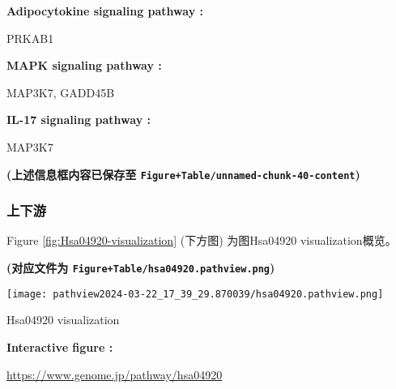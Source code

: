 \documentclass[
]{article}
\begin{document}
\begin{center}\begin{tcolorbox}[colback=gray!10, colframe=gray!50, width=0.9\linewidth, arc=1mm, boxrule=0.5pt]
\textbf{
Adipocytokine signaling pathway
:}

\vspace{0.5em}

    PRKAB1

\vspace{2em}


\textbf{
MAPK signaling pathway
:}

\vspace{0.5em}

    MAP3K7, GADD45B

\vspace{2em}


\textbf{
IL-17 signaling pathway
:}

\vspace{0.5em}

    MAP3K7

\vspace{2em}
\end{tcolorbox}
\end{center}

\textbf{(上述信息框内容已保存至 \texttt{Figure+Table/unnamed-chunk-40-content})}

\hypertarget{epi-path}{%
\subsubsection{上下游}\label{epi-path}}

Figure \ref{fig:Hsa04920-visualization} (下方图) 为图Hsa04920 visualization概览。

\textbf{(对应文件为 \texttt{Figure+Table/hsa04920.pathview.png})}

\def\@captype{figure}
\begin{center}
\texttt{[image: pathview2024-03-22\_17\_39\_29.870039/hsa04920.pathview.png]}
\caption{Hsa04920 visualization}\label{fig:Hsa04920-visualization}
\end{center}
\begin{center}\begin{tcolorbox}[colback=gray!10, colframe=gray!50, width=0.9\linewidth, arc=1mm, boxrule=0.5pt]
\textbf{
Interactive figure
:}

\vspace{0.5em}

    \url{https://www.genome.jp/pathway/hsa04920}

\vspace{2em}
\end{tcolorbox}
\end{center}
\end{document}
